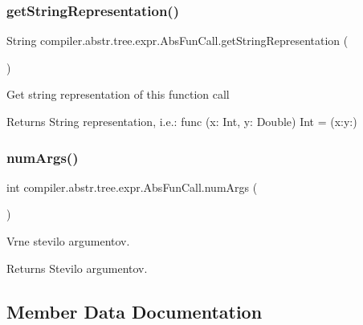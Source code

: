 \subsubsection{\texorpdfstring{get\+String\+Representation()}{getStringRepresentation()}}
{\footnotesize\ttfamily String compiler.\+abstr.\+tree.\+expr.\+Abs\+Fun\+Call.\+get\+String\+Representation (\begin{DoxyParamCaption}{ }\end{DoxyParamCaption})}

Get string representation of this function call \begin{DoxyReturn}{Returns}
String representation, i.\+e.\+: func (x\+: Int, y\+: Double) Int = (x\+:y\+:) 
\end{DoxyReturn}
\mbox{\label{classcompiler_1_1abstr_1_1tree_1_1expr_1_1_abs_fun_call_aa28663eb06c877f1e1a65029c302622d}} 
\subsubsection{\texorpdfstring{num\+Args()}{numArgs()}}
{\footnotesize\ttfamily int compiler.\+abstr.\+tree.\+expr.\+Abs\+Fun\+Call.\+num\+Args (\begin{DoxyParamCaption}{ }\end{DoxyParamCaption})}

Vrne stevilo argumentov.

\begin{DoxyReturn}{Returns}
Stevilo argumentov. 
\end{DoxyReturn}


\subsection{Member Data Documentation}
\mbox{\label{classcompiler_1_1abstr_1_1tree_1_1expr_1_1_abs_fun_call_a47d184725dcf5f4357af2b228859e35a}} 
